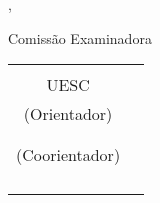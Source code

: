 %
%
\makeatletter
\begin{folhadeaprovacao}

	\begin{center}
		{\large\normalfont\scshape\textbf\imprimirautor}
	\end{center}

	\vspace*{50pt}

	\begin{center}
		\ABNTEXchapterfont\Large\scshape\imprimirtitulo
		\abntex@ifnotempty{\imprimirsubtitulo}{
			{\ABNTEXchapterfont\Large\scshape{\hspace*{-0.3em}: }}{\ABNTEXchapterfont\large\scshape\imprimirsubtitulo}
		}
	\end{center}

	\vspace*{30pt}

%

	\begin{center}
		\imprimirlocal, \imprimirdatadefesa
		\end{center}
		
		\vspace*{7pt}
		\begin{center}
		Comissão Examinadora
		\end{center}
\vspace{-2pt}
\begin{center}
\begin{tabular}{cc}
	\assinatura{\textbf{\imprimirorientador} \\ UESC\\ (Orientador)}&\\
		\assinatura{\textbf{\imprimircoorientador} \\ \imprimirinstCoorientador\\ (Coorientador)}&\\ 
		\assinatura{\textbf{\imprimirbancamembrointerno} \\ \imprimirbancainstmembrointerno} &\\
		\assinatura{\textbf{\imprimirbancamembroexterno} \\ \imprimirbancainstmembroexterno}&\\
	

\end{tabular}
\end{center}
\end{folhadeaprovacao}
